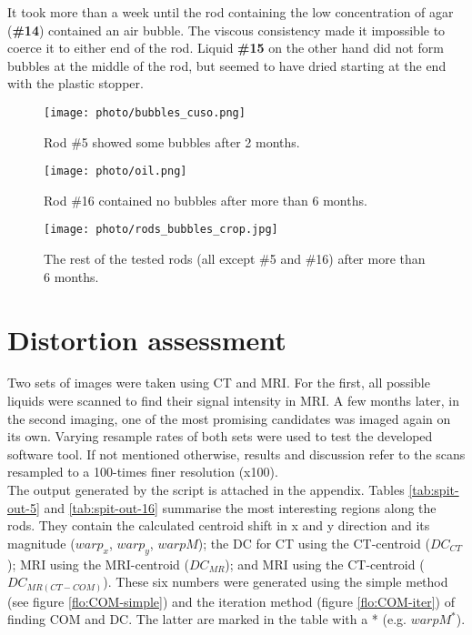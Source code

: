 It took more than a week until the rod containing the low concentration of agar (\textbf{\#14}) contained an air bubble.
The viscous consistency made it impossible to coerce it to either end of the rod.
Liquid \textbf{\#15} on the other hand did not form bubbles at the middle of the rod, but seemed to have dried starting at the end with the plastic stopper.


\begin{figure}[tbh!]
\centering
\texttt{[image: photo/bubbles\_cuso.png]}
\caption{Rod \#5 showed some bubbles after 2 months.}
\label{fig:bubbles_cuso}
\end{figure}

\begin{figure}[tbh!]
\centering
\texttt{[image: photo/oil.png]}
\caption{Rod \#16 contained no bubbles after more than 6 months.}
\label{fig:bubbles_oil}
\end{figure}

\begin{figure}[tbh!]
\centering
\texttt{[image: photo/rods\_bubbles\_crop.jpg]}
\caption{The rest of the tested rods (all except \#5 and \#16) after more than 6 months.}
\label{fig:bubbles}
\end{figure}



\section{Distortion assessment}

Two sets of images were taken using CT and MRI.
For the first, all possible liquids were scanned to find their signal intensity in MRI.
A few months later, in the second imaging, one of the most promising candidates was imaged again on its own.
Varying resample rates of both sets were used to test the developed software tool.
If not mentioned otherwise, results and discussion refer to the scans resampled to a 100-times finer resolution (x100). \\

The output generated by the script is attached in the appendix.
Tables \ref{tab:spit-out-5} and \ref{tab:spit-out-16} summarise the most interesting regions along the rods.
They contain the calculated centroid shift in x and y direction and its magnitude ($warp_x$, $warp_y$, $warpM$); the DC for CT using the CT-centroid ($DC_{CT}$); MRI using the MRI-centroid ($DC_{MR}$); and MRI using the CT-centroid ($DC_{MR(CT-COM)}$).
These six numbers were generated using the simple method (see figure \ref{flo:COM-simple}) and the iteration method (figure \ref{flo:COM-iter}) of finding COM and DC.
The latter are marked in the table with a * (e.g. $warpM^*$).

